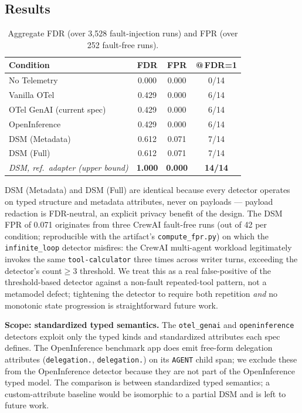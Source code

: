 \documentclass[sigconf,nonacm]{acmart}
\begin{document}
\subsection{Results}

\begin{table}[h]
\centering
\caption{Aggregate FDR (over 3{,}528 fault-injection runs) and FPR (over 252 fault-free runs).}
\label{tab:fdr}
\small
\begin{tabular}{p{2.6cm}ccc}
\toprule
\textbf{Condition} & \textbf{FDR} & \textbf{FPR} & \textbf{@\,FDR=1} \\
\midrule
No Telemetry          & 0.000 & 0.000 & 0/14 \\
Vanilla OTel          & 0.429 & 0.000 & 6/14 \\
OTel GenAI (current spec) & 0.429 & 0.000 & 6/14 \\
OpenInference         & 0.429 & 0.000 & 6/14 \\
DSM (Metadata)        & 0.612 & 0.071 & 7/14 \\
DSM (Full)            & 0.612 & 0.071 & 7/14 \\
\midrule
\textit{DSM, ref.\ adapter (upper bound)} & \textbf{1.000} & \textbf{0.000} & \textbf{14/14} \\
\bottomrule
\end{tabular}
\end{table}

DSM (Metadata) and DSM (Full) are identical because every detector operates on typed structure and metadata attributes, never on payloads --- payload redaction is FDR-neutral, an explicit privacy benefit of the design. The DSM FPR of 0.071 originates from three CrewAI fault-free runs (out of 42 per condition; reproducible with the artifact's \texttt{compute\_fpr.py}) on which the \texttt{infinite\_loop} detector misfires: the CrewAI multi-agent workload legitimately invokes the same \texttt{tool-calculator} three times across writer turns, exceeding the detector's count$\geq$3 threshold. We treat this as a real false-positive of the threshold-based detector against a non-fault repeated-tool pattern, not a metamodel defect; tightening the detector to require both repetition \emph{and} no monotonic state progression is straightforward future work.

\textbf{Scope: standardized typed semantics.} The \texttt{otel\_genai} and \texttt{openinference} detectors exploit only the typed kinds and standardized attributes each spec defines. The OpenInference benchmark app does emit free-form delegation attributes (\texttt{delegation.}, \texttt{delegation.}) on its \texttt{AGENT} child span; we exclude these from the OpenInference detector because they are not part of the OpenInference typed model. The comparison is between standardized typed semantics; a custom-attribute baseline would be isomorphic to a partial DSM and is left to future work.
\end{document}
